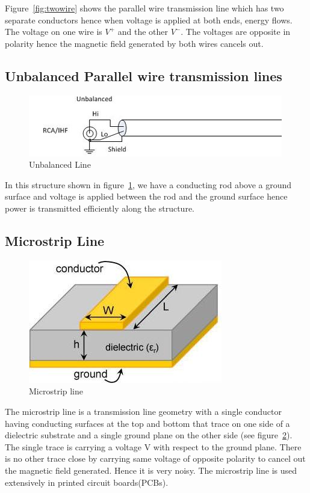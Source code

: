 Figure~\ref{fig:twowire} shows the parallel wire transmission line which has two separate conductors hence when voltage is applied at both ends, energy flows. The voltage on one wire is $V^+$ and the other $V^-$. The voltages are opposite in polarity hence the magnetic field generated by both wires cancels out.

\subsection{Unbalanced Parallel wire transmission lines}
\begin{figure}[h]
\centering
\includegraphics[width=1\linewidth]{graphics/unbalanced}
\caption{Unbalanced Line}
\label{fig:unbalanced}
\end{figure}

In this structure shown in figure~\ref{fig:unbalanced}, we have a conducting rod above a ground surface and voltage is applied between the rod and the ground surface hence power is transmitted efficiently along the structure.

\subsection{Microstrip Line}
\begin{figure}[h]
\centering
\includegraphics[scale=0.6]{graphics/ms (1)}
\caption{Microstrip line}
\label{fig:micro}
\end{figure}

The microstrip line is a transmission line geometry with a single conductor having conducting surfaces at the top and bottom that trace on one side of a dielectric substrate and a single ground plane on the other side (see figure~\ref{fig:micro}). The single trace is carrying a voltage V with respect to the ground plane. There is no other trace close by carrying same voltage of opposite polarity to cancel out the magnetic field generated. Hence it is very noisy. The microstrip line is used extensively in printed circuit boards(PCBs).

